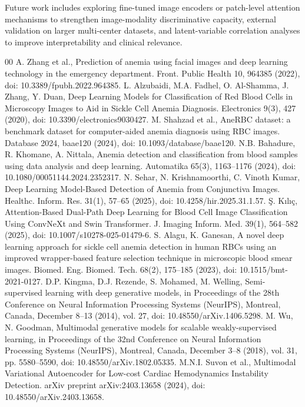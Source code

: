 \documentclass[conference]{IEEEtran}
\begin{document}
Future work includes exploring fine-tuned image encoders or patch-level attention mechanisms to strengthen image-modality discriminative capacity, external validation on larger multi-center datasets, and latent-variable correlation analyses to improve interpretability and clinical relevance.


\FloatBarrier
\begin{thebibliography}{00}
 A. Zhang et al., Prediction of anemia using facial images and deep learning technology in the emergency department. Front. Public Health 10, 964385 (2022), doi: 10.3389/fpubh.2022.964385.
 L. Alzubaidi, M.A. Fadhel, O. Al-Shamma, J. Zhang, Y. Duan, Deep Learning Models for Classification of Red Blood Cells in Microscopy Images to Aid in Sickle Cell Anemia Diagnosis. Electronics 9(3), 427 (2020), doi: 10.3390/electronics9030427.
 M. Shahzad et al., AneRBC dataset: a benchmark dataset for computer-aided anemia diagnosis using RBC images. Database 2024, baae120 (2024), doi: 10.1093/database/baae120.
 N.B. Bahadure, R. Khomane, A. Nittala, Anemia detection and classification from blood samples using data analysis and deep learning. Automatika 65(3), 1163--1176 (2024), doi: 10.1080/00051144.2024.2352317.
 N. Sehar, N. Krishnamoorthi, C. Vinoth Kumar, Deep Learning Model-Based Detection of Anemia from Conjunctiva Images. Healthc. Inform. Res. 31(1), 57--65 (2025), doi: 10.4258/hir.2025.31.1.57.
 \c{S}. K{\i}l{\i}\c{c}, Attention-Based Dual-Path Deep Learning for Blood Cell Image Classification Using ConvNeXt and Swin Transformer. J. Imaging Inform. Med. 39(1), 564--582 (2025), doi: 10.1007/s10278-025-01479-6.
 S. Alagu, K. Ganesan, A novel deep learning approach for sickle cell anemia detection in human RBCs using an improved wrapper-based feature selection technique in microscopic blood smear images. Biomed. Eng. Biomed. Tech. 68(2), 175--185 (2023), doi: 10.1515/bmt-2021-0127.
 D.P. Kingma, D.J. Rezende, S. Mohamed, M. Welling, Semi-supervised learning with deep generative models, in Proceedings of the 28th Conference on Neural Information Processing Systems (NeurIPS), Montreal, Canada, December 8--13 (2014), vol. 27, doi: 10.48550/arXiv.1406.5298.
 M. Wu, N. Goodman, Multimodal generative models for scalable weakly-supervised learning, in Proceedings of the 32nd Conference on Neural Information Processing Systems (NeurIPS), Montreal, Canada, December 3--8 (2018), vol. 31, pp. 5580--5590, doi: 10.48550/arXiv.1802.05335.
 M.N.I. Suvon et al., Multimodal Variational Autoencoder for Low-cost Cardiac Hemodynamics Instability Detection. arXiv preprint arXiv:2403.13658 (2024), doi: 10.48550/arXiv.2403.13658.
\end{thebibliography}
\end{document}
